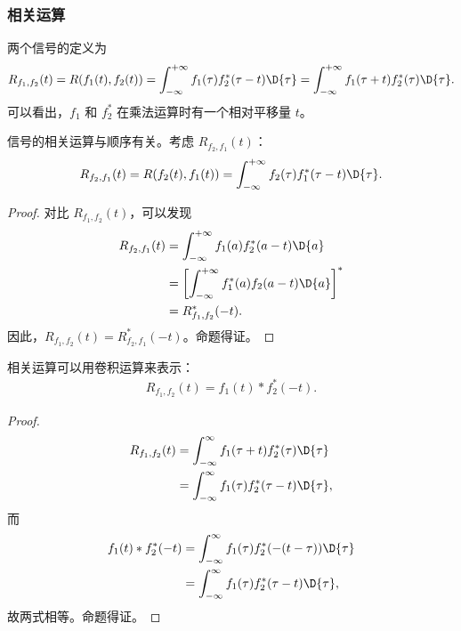 \subsubsection{相关运算}

\begin{definition}[相关运算]
    两个信号的定义为
    \begin{align*}
        R_{f_1, f_2}(t)
        = R(f_1(t), f_2(t))
        = \int_{-\infty}^{+\infty}f_1(\tau)f_2^*(\tau - t)\D{\tau}
        = \int_{-\infty}^{+\infty}f_1(\tau + t)f_2^*(\tau)\D{\tau}.
    \end{align*}
    可以看出，$f_1$ 和 $f_2^*$ 在乘法运算时有一个相对平移量 $t$。
\end{definition}

\begin{property}
    信号的相关运算与顺序有关。考虑 $R_{f_2, f_1}(t)$：
    \begin{align*}
        R_{f_2, f_1}(t) = R(f_2(t), f_1(t)) = \int_{-\infty}^{+\infty}f_2(\tau)f_1^*(\tau - t)\D{\tau}.
    \end{align*}
\end{property}

\begin{proof}
    对比 $R_{f_1, f_2}(t)$，可以发现
    \begin{align*}
        R_{f_2, f_1}(t) & = \int_{-\infty}^{+\infty}f_1(a)f_2^*(a - t)\D{a} \\
        & = \left[\int_{-\infty}^{+\infty}f_1^*(a)f_2(a - t)\D{a}\right]^* \\
        & = R_{f_1, f_2}^*(-t).
    \end{align*}
    因此，$R_{f_1, f_2}(t) = R_{f_2, f_1}^*(-t)$。命题得证。
\end{proof}

\begin{property}[相关运算与卷积运算的关系]
    相关运算可以用卷积运算来表示：
    \begin{align*}
        R_{f_1, f_2}(t) = f_1(t) * f_2^*(-t).
    \end{align*}
\end{property}

\begin{proof}
    \begin{align*}
        R_{f_1,f_2}(t) & = \int_{-\infty}^\infty f_1(\tau + t)f_2^*(\tau)\D{\tau} \\
        & = \int_{-\infty}^\infty f_1(\tau)f_2^*(\tau-t)\D{\tau},
    \end{align*}
    而
    \begin{align*}
        f_1(t)*f_2^*(-t) & = \int_{-\infty}^{\infty}f_1(\tau)f_2^*(-(t - \tau))\D{\tau} \\
        & = \int_{-\infty}^{\infty}f_1(\tau)f_2^*(\tau - t)\D{\tau},
    \end{align*}
    故两式相等。命题得证。
\end{proof}

